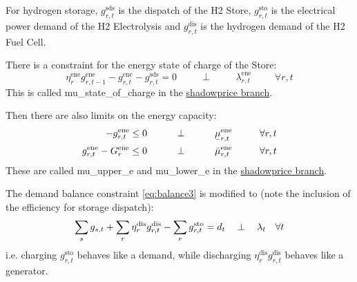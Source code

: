 \documentclass[final,3p,times]{elsarticle}
\newcommand{\ubar}[1]{\text{\b{$#1$}}}
\def\l{\lambda}
\begin{document}
For hydrogen storage, $g^{\textrm{sds}}_{r,t}$ is the dispatch of the H2 Store, $g^{\textrm{sto}}_{r,t}$ is the electrical power demand of the H2 Electrolysis and $g^{\textrm{dis}}_{r,t}$ is the hydrogen demand of the H2 Fuel Cell.

There is a constraint for the energy state of charge of the Store:
\begin{equation}
  \eta^{\textrm{ene}}_r g^{\textrm{ene}}_{r,t-1} - g^{\textrm{ene}}_{r,t} - g^{\textrm{sds}}_{r,t} = 0  \hspace{1cm}\perp \hspace{1cm} \lambda^{\textrm{ene}}_{r,t} \hspace{1cm} \forall r,t  \label{eq:soc3}
\end{equation}
This is called mu\_state\_of\_charge in the \href{https://github.com/PyPSA/PyPSA/blob/shadowprices/pypsa/linopf.py}{shadowprice branch}.

Then there are also limits on the energy capacity:
\begin{align}
    -g^{\textrm{ene}}_{r,t}\leq 0 \hspace{1cm}\perp \hspace{1cm} \ubar{\mu}^{\textrm{ene}}_{r,t} \hspace{1cm} \forall r,t  \label{eq:storlower3}\\
    g^{\textrm{ene}}_{r,t} - G^{\textrm{ene}}_r \leq 0 \hspace{1cm}\perp \hspace{1cm} \bar{\mu}^{\textrm{ene}}_{r,t} \hspace{1cm} \forall r,t \label{eq:storupper3}
\end{align}
These are called mu\_upper\_e and mu\_lower\_e in the \href{https://github.com/PyPSA/PyPSA/blob/shadowprices/pypsa/linopf.py}{shadowprice branch}.


The demand balance constraint \eqref{eq:balance3} is modified to (note the inclusion of the efficiency for storage dispatch):
\begin{align}
   \sum_s g_{s,t} + \sum_r \eta^{\textrm{dis}}_r g^{\textrm{dis}}_{r,t} - \sum_r g^{\textrm{sto}}_{r,t}  =  d_t \hspace{0.34cm}\perp \hspace{0.34cm} \l_t \hspace{0.34cm} \forall t \label{eq:balance4}
\end{align}
i.e. charging $g^{\textrm{sto}}_{r,t}$ behaves like a demand, while discharging $\eta^{\textrm{dis}}_rg^{\textrm{dis}}_{r,t}$ behaves like a generator.
\end{document}

